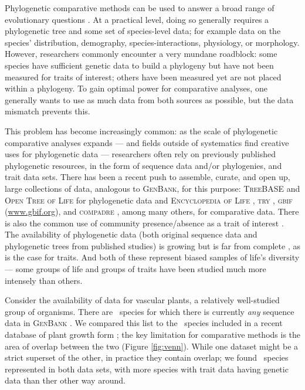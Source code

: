 \documentclass[a4paper,11pt]{article}
\begin{document}
Phylogenetic comparative methods can be used to answer a broad range of evolutionary questions \citep{omeara-2012, PennellHarmon}.  At a practical level, doing so generally requires a phylogenetic tree and some set of species-level data; for example data on the species' distribution, demography, species-interactions, physiology, or morphology. However, researchers commonly encounter a very mundane roadblock: some species have sufficient genetic data to build a phylogeny but have not been measured for traits of interest; others have been measured yet are not placed within a phylogeny.  To gain optimal power for comparative analyses, one generally wants to use as much data from both sources as possible, but the data mismatch prevents this.

This problem has become increasingly common: as the scale of phylogenetic comparative analyses expands --- and fields outside of systematics find creative uses for phylogenetic data --- researchers often rely on previously published phylogenetic resources, in the form of sequence data and/or phylogenies, and trait data sets. There has been a recent push to assemble, curate, and open up, large collections of data, analogous to \textsc{GenBank}, for this purpose: \textsc{TreeBASE} \citep{treebase} and \textsc{Open Tree of Life} \citep{OpenTree} for phylogenetic data and \textsc{Encyclopedia of Life} \citep{eol}, \textsc{try} \citep{try}, \textsc{gbif} (\url{www.gbif.org}), and \textsc{compadre} \citep{salguero2015}, among many others, for comparative data.  There is also the common use of community presence/absence as a trait of interest \citep{vellend2011measuring}.  The availability of phylogenetic data (both original sequence data and phylogenetic trees from published studies) is growing but is far from complete \citep{hinchliff2014}, as is the case for traits. And both of these represent biased samples of life's diversity --- some groups of life and groups of traits have been studied much more intensely than others.

Consider the availability of data for vascular plants, a relatively well-studied group of organisms. There are \ngenbank\ species for which there is currently \emph{any} sequence data in \textsc{GenBank} \citep[As of May 2015 --- accessed using the \textsc{ncbi taxonomy browser};][\url{http://www.ncbi.nlm.nih.gov/Taxonomy/Browser/wwwtax.cgi}]{ncbi-taxonomy}. We compared this list to the \nwoody\ species included in a recent database of plant growth form \citep{Zanne}; the key limitation for comparative methods is the area of overlap between the two (Figure \ref{fig:venn}).  While one dataset might be a strict superset of the other, in practice they contain overlap; we found \noverlap\ species represented in both data sets, with more species with trait data having genetic data than ther other way around.
\end{document}
